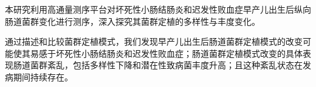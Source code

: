 
\begin{summary}
  本研究利用高通量测序平台对坏死性小肠结肠炎和迟发性败血症早产儿出生后纵向肠道菌群变化进行测序，深入探究其菌群定植的多样性与丰度变化。

  通过描述和比较菌群定植模式，我们发现早产儿出生后肠道菌群定植模式的改变可能使其易感于坏死性小肠结肠炎和迟发性败血症；肠道菌群定植模式改变的具体表现肠道菌群紊乱，包括多样性下降和潜在性致病菌丰度升高；且这种紊乱状态在发病期间持续存在。

\end{summary}
